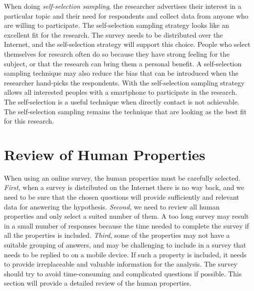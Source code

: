     When doing {\it self-selection sampling}, the researcher advertises their interest in a particular topic and their need for respondents and collect data from anyone who are willing to participate. The self-selection sampling strategy looks like an excellent fit for the research. The survey needs to be distributed over the Internet, and the self-selection strategy will support this choice. People who select themselves for research often do so because they have strong feeling for the subject, or that the research can bring them a personal benefit. A self-selection sampling technique may also reduce the bias that can be introduced when the researcher hand-picks the respondents. With the self-selection sampling strategy allows all interested peoples with a smartphone to participate in the research. The self-selection is a useful technique when directly contact is not achievable. The self-selection sampling remains the technique that are looking as the best fit for this research.

  \section{Review of Human Properties}\label{sec:reviewofproperties} 

      When using an online survey, the human properties must be carefully selected. {\it First}, when a survey is distributed on the Internet there is no way back, and we need to be sure that the chosen questions will provide sufficiently and relevant data for answering the hypothesis. {\it Second}, we need to review all human properties and only select a suited number of them. A too long survey may result in a small number of responses because the time needed to complete the survey if all the properties is included. {\it Third}, some of the properties may not have a suitable grouping of answers, and may be challenging to include in a survey that needs to be replied to on a mobile device. If such a property is included, it needs to provide irreplaceable and valuable information for the analysis. The survey should try to avoid time-consuming and complicated questions if possible. This section will provide a detailed review of the human properties.

